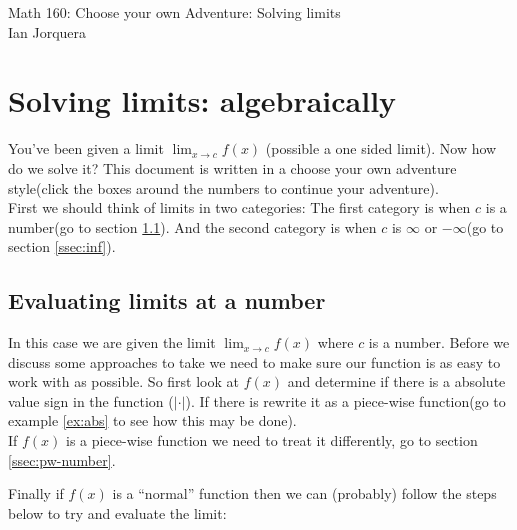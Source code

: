 \documentclass[12pt]{article}
\begin{document}

\begin{center}
    \Large Math 160: Choose your own Adventure: Solving limits\\
    Ian Jorquera 
\end{center}

\section{Solving limits: algebraically}

You've been given a limit $\displaystyle{\lim_{x\to c}f(x)}$ (possible a one sided limit). Now how do we solve it? This document is written in a choose your own adventure style(click the boxes around the numbers to continue your adventure).\\

First we should think of limits in two categories: The first category is when $c$ is a number(go to section \ref{ssec:number}). And the second category is when $c$ is $\infty$ or $-\infty$(go to section \ref{ssec:inf}).\\

\subsection{Evaluating limits at a number}
\label{ssec:number}
In this case we are given the limit $\displaystyle{\lim_{x\to c}f(x)}$ where $c$ is a number. Before we discuss some approaches to take we need to make sure our function is as easy to work with as possible. So first look at $f(x)$ and determine if there is a absolute value sign in the function ($|\cdot|$). If there is rewrite it as a piece-wise function(go to example \ref{ex:abs} to see how this may be done).\\

If $f(x)$ is a piece-wise function we need to treat it differently, go to section \ref{ssec:pw-number}.

Finally if $f(x)$ is a ``normal'' function then we can (probably) follow the steps below to try and evaluate the limit:
\end{document}

